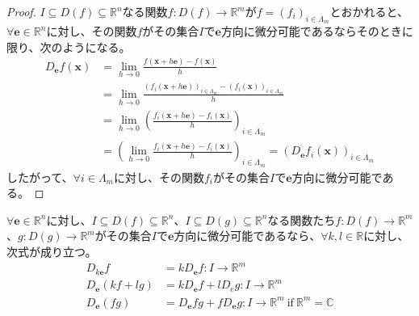 \documentclass[dvipdfmx]{jsarticle}
\begin{document}
\begin{proof}
$I \subseteq D(f) \subseteq \mathbb{R}^{n}$なる関数$f:D(f) \rightarrow \mathbb{R}^{m}$が$f = \left( f_{i} \right)_{i \in \varLambda_{m}}$とおかれると、$\forall\mathbf{e} \in \mathbb{R}^{n}$に対し、その関数$f$がその集合$I$で$\mathbf{e}$方向に微分可能であるならそのときに限り、次のようになる。
\begin{align*}
D_{\mathbf{e}}f\left( \mathbf{x} \right) &= \lim_{h \rightarrow 0}\frac{f\left( \mathbf{x} + h\mathbf{e} \right) - f\left( \mathbf{x} \right)}{h}\\
&= \lim_{h \rightarrow 0}\frac{\left( f_{i}\left( \mathbf{x} + h\mathbf{e} \right) \right)_{i \in \varLambda_{m}} - \left( f_{i}\left( \mathbf{x} \right) \right)_{i \in \varLambda_{m}}}{h}\\
&= \lim_{h \rightarrow 0}\left( \frac{f_{i}\left( \mathbf{x} + h\mathbf{e} \right) - f_{i}\left( \mathbf{x} \right)}{h} \right)_{i \in \varLambda_{m}}\\
&= \left( \lim_{h \rightarrow 0}\frac{f_{i}\left( \mathbf{x} + h\mathbf{e} \right) - f_{i}\left( \mathbf{x} \right)}{h} \right)_{i \in \varLambda_{m}} = \left( D_{\mathbf{e}}f_{i}\left( \mathbf{x} \right) \right)_{i \in \varLambda_{m}}
\end{align*}
したがって、$\forall i \in \varLambda_{m}$に対し、その関数$f_{i}$がその集合$I$で$\mathbf{e}$方向に微分可能である。
\end{proof}
\begin{thm}\label{4.2.3.3}
$\forall\mathbf{e} \in \mathbb{R}^{n}$に対し、$I \subseteq D(f) \subseteq \mathbb{R}^{n}$、$I \subseteq D(g) \subseteq \mathbb{R}^{n}$なる関数たち$f:D(f) \rightarrow \mathbb{R}^{m}$、$g:D(g) \rightarrow \mathbb{R}^{m}$がその集合$I$で$\mathbf{e}$方向に微分可能であるなら、$\forall k,l \in \mathbb{R}$に対し、次式が成り立つ。
\begin{align*}
D_{k\mathbf{e}}f &= kD_{\mathbf{e}}f:I \rightarrow \mathbb{R}^{m}\\
D_{\mathbf{e}}(kf + lg) &= kD_{\mathbf{e}}f + lD_{e}g:I \rightarrow \mathbb{R}^{m}\\
D_{\mathbf{e}}(fg) &= D_{\mathbf{e}}fg + fD_{\mathbf{e}}g:I \rightarrow \mathbb{R}^{m}\ \mathrm{if}\ \mathbb{R}^{m} = \mathbb{C}
\end{align*}
\end{thm}
\end{document}
